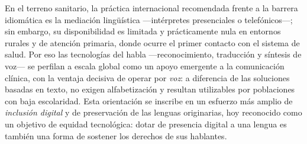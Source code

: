 \documentclass[12pt,a4paper]{article}
\newenvironment{bloqueObsDos}{\par\color{verdeOK}}{\par}
\begin{document}
\begin{bloqueObsDos}
\noindent En el terreno sanitario, la pr{\'a}ctica internacional recomendada frente a la barrera
idiom{\'a}tica es la mediaci{\'o}n ling{\"u}{\'i}stica ---int{\'e}rpretes presenciales o
telef{\'o}nicos---; sin embargo, su disponibilidad es limitada y pr{\'a}cticamente nula en entornos
rurales y de atenci{\'o}n primaria, donde ocurre el primer contacto con el sistema de salud. Por eso
las tecnolog{\'i}as del habla ---reconocimiento, traducci{\'o}n y s{\'i}ntesis de voz--- se perfilan
a escala global como un apoyo emergente a la comunicaci{\'o}n cl{\'i}nica, con la ventaja decisiva de
operar por \emph{voz}: a diferencia de las soluciones basadas en texto, no exigen alfabetizaci{\'o}n
y resultan utilizables por poblaciones con baja escolaridad. Esta orientaci{\'o}n se inscribe en un
esfuerzo m{\'a}s amplio de \emph{inclusi{\'o}n digital} y de preservaci{\'o}n de las lenguas
originarias, hoy reconocido como un objetivo de equidad tecnol{\'o}gica: dotar de presencia digital a
una lengua es tambi{\'e}n una forma de sostener los derechos de sus hablantes.
\end{bloqueObsDos}
\end{document}
